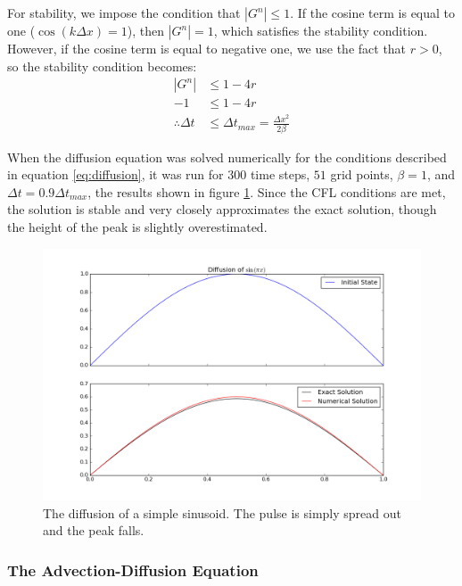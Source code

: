 \documentclass[twocolumn]{article}
\begin{document}
For stability, we impose the condition that $|G^n| \leq 1$. If the
cosine term is equal to one ($\cos(k \Delta x) = 1$), then $|G^n| =
1$, which satisfies the stability condition. However, if the cosine
term is equal to negative one, we use the fact that $r > 0$, so the
stability condition becomes:
\begin{equation}
\begin{aligned}
|G^n| &\leq 1 - 4 r \\
- 1 &\leq 1 - 4 r \\
\therefore \Delta t &\leq \Delta t_{max} = \frac{\Delta x^2}{2 \beta}
\end{aligned}
\end{equation}

When the diffusion equation was solved numerically for the conditions
described in equation \ref{eq:diffusion}, it was run for $300$ time
steps, $51$ grid points, $\beta = 1$, and $\Delta t = 0.9 \Delta
t_{max}$, the results shown in figure \ref{fig:diffusion}. Since the
CFL conditions are met, the solution is stable and very closely
approximates the exact solution, though the height of the peak is
slightly overestimated.

\begin{figure}
	\includegraphics[width=\linewidth]{diffusion.png}
	\caption{
		The diffusion of a simple sinusoid. The pulse is simply spread out
		and the peak falls.
	}
	\label{fig:diffusion}
\end{figure}

\subsubsection{The Advection-Diffusion Equation}
\end{document}
